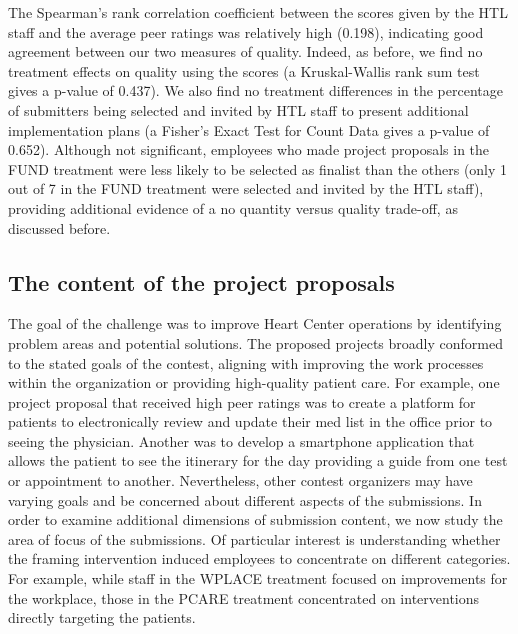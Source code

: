 \documentclass[12pt, titlepage]{article}
\begin{document}
The Spearman's rank correlation coefficient between the scores given by
the HTL staff and the average peer ratings was relatively high (0.198),
indicating good agreement between our two measures of quality. Indeed,
as before, we find no treatment effects on quality using the scores (a
Kruskal-Wallis rank sum test gives a p-value of 0.437). We also find no
treatment differences in the percentage of submitters being selected and
invited by HTL staff to present additional implementation plans (a
Fisher's Exact Test for Count Data gives a p-value of 0.652). Although
not significant, employees who made project proposals in the FUND
treatment were less likely to be selected as finalist than the others
(only 1 out of 7 in the FUND treatment were selected and invited by the
HTL staff), providing additional evidence of a no quantity versus
quality trade-off, as discussed before.

\subsection{The content of the project
proposals}\label{the-content-of-the-project-proposals}

The goal of the challenge was to improve Heart Center operations by
identifying problem areas and potential solutions. The proposed projects
broadly conformed to the stated goals of the contest, aligning with
improving the work processes within the organization or providing
high-quality patient care. For example, one project proposal that
received high peer ratings was to create a platform for patients to
electronically review and update their med list in the office prior to
seeing the physician. Another was to develop a smartphone application
that allows the patient to see the itinerary for the day providing a
guide from one test or appointment to another. Nevertheless, other
contest organizers may have varying goals and be concerned about
different aspects of the submissions. In order to examine additional
dimensions of submission content, we now study the area of focus of the
submissions. Of particular interest is understanding whether the framing
intervention induced employees to concentrate on different categories.
For example, while staff in the WPLACE treatment focused on improvements
for the workplace, those in the PCARE treatment concentrated on
interventions directly targeting the patients.
\end{document}
